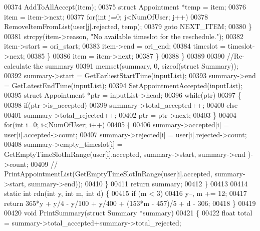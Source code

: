 \begin{DoxyCode}
00374                     AddToAllAccept(item);
00375                     \textcolor{keyword}{struct }Appointment *temp = item;
00376                     item = item->next;
00377                     \textcolor{keywordflow}{for}(\textcolor{keywordtype}{int} j=0; j<NumOfUser; j++)
00378                         RemoveItemFromList(user[j].rejected, temp);
00379                     \textcolor{keywordflow}{goto} NEXT\_ITEM;
00380                 \}
00381                 strcpy(item->reason, \textcolor{stringliteral}{"No available timeslot for the reschedule."});
00382                 item->start = ori\_start;
00383                 item->end = ori\_end;
00384                 timeslot = timeslot->next;
00385             \}
00386             item = item->next;
00387         \}
00388     \}
00389 
00390     \textcolor{comment}{//Re-calculate the summary}
00391     memset(summary, 0, \textcolor{keyword}{sizeof}(\textcolor{keyword}{struct} Summary));
00392     summary->start = GetEarliestStartTime(inputList);
00393     summary->end = GetLatestEndTime(inputList);
00394     SetAppointmentAccepted(inputList);
00395     \textcolor{keyword}{struct }Appointment *ptr = inputList->head;
00396     \textcolor{keywordflow}{while}(ptr)
00397     \{
00398         \textcolor{keywordflow}{if}(ptr->is\_accepted)
00399             summary->total\_accepted++;
00400         \textcolor{keywordflow}{else}
00401             summary->total\_rejected++;
00402         ptr = ptr->next;
00403     \}
00404     \textcolor{keywordflow}{for}(\textcolor{keywordtype}{int} i=0; i<NumOfUser; i++)
00405     \{
00406         summary->accepted[i] = user[i].accepted->count;
00407         summary->rejected[i] = user[i].rejected->count;
00408         summary->empty\_timeslot[i] = GetEmptyTimeSlotInRange(user[i].accepted, summary->start, summary->end
      )->count;
00409         \textcolor{comment}{// PrintAppointmentList(GetEmptyTimeSlotInRange(user[i].accepted, summary->start, summary->end));}
00410     \}
00411     \textcolor{keywordflow}{return} summary;
00412 \}
00413 
00414 \textcolor{keyword}{static} \textcolor{keywordtype}{int} rdn(\textcolor{keywordtype}{int} y, \textcolor{keywordtype}{int} m, \textcolor{keywordtype}{int} d) \{
00415     \textcolor{keywordflow}{if} (m < 3)
00416         y--, m += 12;
00417     \textcolor{keywordflow}{return} 365*y + y/4 - y/100 + y/400 + (153*m - 457)/5 + d - 306;
00418 \}
00419 
00420 \textcolor{keywordtype}{void} PrintSummary(\textcolor{keyword}{struct} Summary *summary)
00421 \{
00422     \textcolor{keywordtype}{float} total = summary->total\_accepted+summary->total\_rejected;

\end{DoxyCode}
